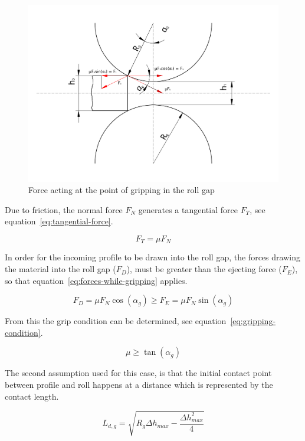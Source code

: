 \documentclass[11pt]{PyRollDocs}
\begin{document}
    \begin{figure}
        \centering
        \includegraphics[width=.7\linewidth]{img/gripping-forces}
        \caption{Force acting at the point of gripping in the roll gap}
        \label{fig:roll-gap-forces}
    \end{figure}

    Due to friction, the normal force $F_N$ generates a tangential force $F_T$, see equation~\ref{eq:tangential-force}.

    \begin{equation}
        F_T = \mu F_N
        \label{eq:tangential-force}
    \end{equation}

    In order for the incoming profile to be drawn into the roll gap, the forces drawing the material into the roll gap ($F_D$),
    must be greater than the ejecting force ($F_E$), so that equation~\ref{eq:forces-while-gripping} applies.

    \begin{equation}
        F_D = \mu F_N \cos\left( \alpha_{g} \right) \geq F_E = \mu F_N \sin\left( \alpha_{g}  \right)
        \label{eq:forces-while-gripping}
    \end{equation}

    From this the grip condition can be determined, see equation~\ref{eq:gripping-condition}.

    \begin{equation}
        \mu \geq \tan\left( \alpha_{g} \right)
        \label{eq:gripping-condition}
    \end{equation}

    The second assumption used for this case, is that the initial contact point between profile and roll happens at a distance which is represented by the contact length.

    \begin{equation}
        L_{d, g} = \sqrt{R_{g} \Delta h_{max} - \frac{\Delta h_{max}^2}{4}}
        \label{eq:contact-length-gripping}
    \end{equation}
\end{document}
